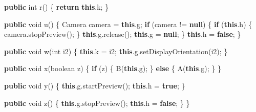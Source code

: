 \documentclass[
]{article}
\newenvironment{Shaded}{}{}
\newcommand{\ControlFlowTok}[1]{\textcolor[rgb]{0.00,0.44,0.13}{\textbf{#1}}}
\newcommand{\DataTypeTok}[1]{\textcolor[rgb]{0.56,0.13,0.00}{#1}}
\newcommand{\FunctionTok}[1]{\textcolor[rgb]{0.02,0.16,0.49}{#1}}
\newcommand{\KeywordTok}[1]{\textcolor[rgb]{0.00,0.44,0.13}{\textbf{#1}}}
\newcommand{\NormalTok}[1]{#1}
\newcommand{\OperatorTok}[1]{\textcolor[rgb]{0.40,0.40,0.40}{#1}}
\begin{document}
\begin{Shaded}
\begin{Highlighting}[]
    \KeywordTok{public} \DataTypeTok{int} \FunctionTok{r}\OperatorTok{()} \OperatorTok{\{}
        \ControlFlowTok{return} \KeywordTok{this}\OperatorTok{.}\FunctionTok{k}\OperatorTok{;}
    \OperatorTok{\}}

    \KeywordTok{public} \DataTypeTok{void} \FunctionTok{u}\OperatorTok{()} \OperatorTok{\{}
\NormalTok{        Camera camera }\OperatorTok{=} \KeywordTok{this}\OperatorTok{.}\FunctionTok{g}\OperatorTok{;}
        \ControlFlowTok{if} \OperatorTok{(}\NormalTok{camera }\OperatorTok{!=} \KeywordTok{null}\OperatorTok{)} \OperatorTok{\{}
            \ControlFlowTok{if} \OperatorTok{(}\KeywordTok{this}\OperatorTok{.}\FunctionTok{h}\OperatorTok{)} \OperatorTok{\{}
\NormalTok{                camera}\OperatorTok{.}\FunctionTok{stopPreview}\OperatorTok{();}
            \OperatorTok{\}}
            \KeywordTok{this}\OperatorTok{.}\FunctionTok{g}\OperatorTok{.}\FunctionTok{release}\OperatorTok{();}
            \KeywordTok{this}\OperatorTok{.}\FunctionTok{g} \OperatorTok{=} \KeywordTok{null}\OperatorTok{;}
        \OperatorTok{\}}
        \KeywordTok{this}\OperatorTok{.}\FunctionTok{h} \OperatorTok{=} \KeywordTok{false}\OperatorTok{;}
    \OperatorTok{\}}

    \KeywordTok{public} \DataTypeTok{void} \FunctionTok{w}\OperatorTok{(}\DataTypeTok{int}\NormalTok{ i2}\OperatorTok{)} \OperatorTok{\{}
        \KeywordTok{this}\OperatorTok{.}\FunctionTok{k} \OperatorTok{=}\NormalTok{ i2}\OperatorTok{;}
        \KeywordTok{this}\OperatorTok{.}\FunctionTok{g}\OperatorTok{.}\FunctionTok{setDisplayOrientation}\OperatorTok{(}\NormalTok{i2}\OperatorTok{);}
    \OperatorTok{\}}

    \KeywordTok{public} \DataTypeTok{void} \FunctionTok{x}\OperatorTok{(}\DataTypeTok{boolean}\NormalTok{ z}\OperatorTok{)} \OperatorTok{\{}
        \ControlFlowTok{if} \OperatorTok{(}\NormalTok{z}\OperatorTok{)} \OperatorTok{\{}
            \FunctionTok{B}\OperatorTok{(}\KeywordTok{this}\OperatorTok{.}\FunctionTok{g}\OperatorTok{);}
        \OperatorTok{\}} \ControlFlowTok{else} \OperatorTok{\{}
            \FunctionTok{A}\OperatorTok{(}\KeywordTok{this}\OperatorTok{.}\FunctionTok{g}\OperatorTok{);}
        \OperatorTok{\}}
    \OperatorTok{\}}

    \KeywordTok{public} \DataTypeTok{void} \FunctionTok{y}\OperatorTok{()} \OperatorTok{\{}
        \KeywordTok{this}\OperatorTok{.}\FunctionTok{g}\OperatorTok{.}\FunctionTok{startPreview}\OperatorTok{();}
        \KeywordTok{this}\OperatorTok{.}\FunctionTok{h} \OperatorTok{=} \KeywordTok{true}\OperatorTok{;}
    \OperatorTok{\}}

    \KeywordTok{public} \DataTypeTok{void} \FunctionTok{z}\OperatorTok{()} \OperatorTok{\{}
        \KeywordTok{this}\OperatorTok{.}\FunctionTok{g}\OperatorTok{.}\FunctionTok{stopPreview}\OperatorTok{();}
        \KeywordTok{this}\OperatorTok{.}\FunctionTok{h} \OperatorTok{=} \KeywordTok{false}\OperatorTok{;}
    \OperatorTok{\}}
\OperatorTok{\}}
\end{Highlighting}
\end{Shaded}
\end{document}
